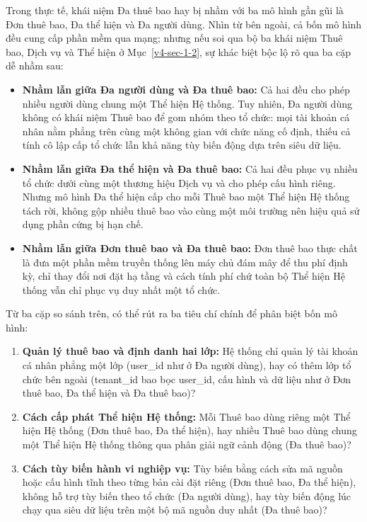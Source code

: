 Trong thực tế, khái niệm Đa thuê bao hay bị nhầm với ba mô hình gần gũi là Đơn thuê bao, Đa thể hiện và Đa người dùng. Nhìn từ bên ngoài, cả bốn mô hình đều cung cấp phần mềm qua mạng; nhưng nếu soi qua bộ ba khái niệm Thuê bao, Dịch vụ và Thể hiện ở Mục~\ref{v4-sec-1-2}, sự khác biệt bộc lộ rõ qua ba cặp dễ nhầm sau:

\begin{itemize}
\item
  \textbf{Nhầm lẫn giữa Đa người dùng và Đa thuê bao:} Cả hai đều cho phép nhiều người dùng chung một Thể hiện Hệ thống. Tuy nhiên, Đa người dùng không có khái niệm Thuê bao để gom nhóm theo tổ chức: mọi tài khoản cá nhân nằm phẳng trên cùng một không gian với chức năng cố định, thiếu cả tính cô lập cấp tổ chức lẫn khả năng tùy biến động dựa trên siêu dữ liệu.
\item
  \textbf{Nhầm lẫn giữa Đa thể hiện và Đa thuê bao:} Cả hai đều phục vụ nhiều tổ chức dưới cùng một thương hiệu Dịch vụ và cho phép cấu hình riêng. Nhưng mô hình Đa thể hiện cấp cho mỗi Thuê bao một Thể hiện Hệ thống tách rời, không gộp nhiều thuê bao vào cùng một môi trường nên hiệu quả sử dụng phần cứng bị hạn chế.
\item
  \textbf{Nhầm lẫn giữa Đơn thuê bao và Đa thuê bao:} Đơn thuê bao thực chất là đưa một phần mềm truyền thống lên máy chủ đám mây để thu phí định kỳ, chỉ thay đổi nơi đặt hạ tầng và cách tính phí chứ toàn bộ Thể hiện Hệ thống vẫn chỉ phục vụ duy nhất một tổ chức.
\end{itemize}

Từ ba cặp so sánh trên, có thể rút ra ba tiêu chí chính để phân biệt bốn mô hình:

\begin{enumerate}
\def\labelenumi{\arabic{enumi}.}
\item
  \textbf{Quản lý thuê bao và định danh hai lớp:} Hệ thống chỉ quản lý tài khoản cá nhân phẳng một lớp (user\_\allowbreak{}id như ở Đa người dùng), hay có thêm lớp tổ chức bên ngoài (tenant\_\allowbreak{}id bao bọc user\_\allowbreak{}id, cấu hình và dữ liệu như ở Đơn thuê bao, Đa thể hiện và Đa thuê bao)?
\item
  \textbf{Cách cấp phát Thể hiện Hệ thống:} Mỗi Thuê bao dùng riêng một Thể hiện Hệ thống (Đơn thuê bao, Đa thể hiện), hay nhiều Thuê bao dùng chung một Thể hiện Hệ thống thông qua phân giải ngữ cảnh động (Đa thuê bao)?
\item
  \textbf{Cách tùy biến hành vi nghiệp vụ:} Tùy biến bằng cách sửa mã nguồn hoặc cấu hình tĩnh theo từng bản cài đặt riêng (Đơn thuê bao, Đa thể hiện), không hỗ trợ tùy biến theo tổ chức (Đa người dùng), hay tùy biến động lúc chạy qua siêu dữ liệu trên một bộ mã nguồn duy nhất (Đa thuê bao)?
\end{enumerate}

